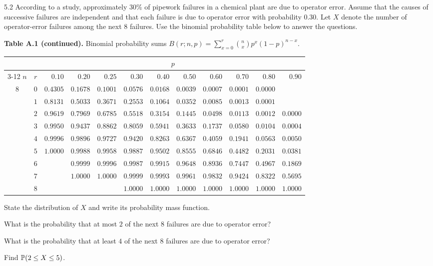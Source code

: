 \documentclass[11pt,oneside]{article}
\begin{document}
\begin{problem}{5.2}
According to a study, approximately $30\%$ of pipework failures in a chemical plant are due to operator error. Assume that the causes of successive failures are independent and that each failure is due to operator error with probability $0.30$. Let $X$ denote the number of operator-error failures among the next $8$ failures. Use the binomial probability table below to answer the questions.

\begin{center}
\begingroup
\scriptsize
\setlength{\tabcolsep}{3.2pt}
\renewcommand{\arraystretch}{1.18}
\noindent\textbf{Table A.1 (continued).} Binomial probability sums $B(r;n,p)=\displaystyle\sum_{x=0}^{r}\binom nx p^x(1-p)^{n-x}$.
\par\smallskip
\begin{tabular}{@{}cc*{10}{r}@{}}
\toprule
&&\multicolumn{10}{c}{$p$}\\
\cmidrule(l){3-12}
$n$ & $r$ & $0.10$ & $0.20$ & $0.25$ & $0.30$ & $0.40$ & $0.50$ & $0.60$ & $0.70$ & $0.80$ & $0.90$\\
\midrule
$8$ & $0$ & $0.4305$ & $0.1678$ & $0.1001$ & $0.0576$ & $0.0168$ & $0.0039$ & $0.0007$ & $0.0001$ & $0.0000$ & {}\\
& $1$ & $0.8131$ & $0.5033$ & $0.3671$ & $0.2553$ & $0.1064$ & $0.0352$ & $0.0085$ & $0.0013$ & $0.0001$ & {}\\
& $2$ & $0.9619$ & $0.7969$ & $0.6785$ & $0.5518$ & $0.3154$ & $0.1445$ & $0.0498$ & $0.0113$ & $0.0012$ & $0.0000$\\
& $3$ & $0.9950$ & $0.9437$ & $0.8862$ & $0.8059$ & $0.5941$ & $0.3633$ & $0.1737$ & $0.0580$ & $0.0104$ & $0.0004$\\
& $4$ & $0.9996$ & $0.9896$ & $0.9727$ & $0.9420$ & $0.8263$ & $0.6367$ & $0.4059$ & $0.1941$ & $0.0563$ & $0.0050$\\
& $5$ & $1.0000$ & $0.9988$ & $0.9958$ & $0.9887$ & $0.9502$ & $0.8555$ & $0.6846$ & $0.4482$ & $0.2031$ & $0.0381$\\
& $6$ & {} & $0.9999$ & $0.9996$ & $0.9987$ & $0.9915$ & $0.9648$ & $0.8936$ & $0.7447$ & $0.4967$ & $0.1869$\\
& $7$ & {} & $1.0000$ & $1.0000$ & $0.9999$ & $0.9993$ & $0.9961$ & $0.9832$ & $0.9424$ & $0.8322$ & $0.5695$\\
& $8$ & {} & {} & {} & $1.0000$ & $1.0000$ & $1.0000$ & $1.0000$ & $1.0000$ & $1.0000$ & $1.0000$\\
\bottomrule
\end{tabular}
\endgroup
\end{center}

\begin{problemsubparts}
\item State the distribution of $X$ and write its probability mass function.
\item What is the probability that at most $2$ of the next $8$ failures are due to operator error?
\item What is the probability that at least $4$ of the next $8$ failures are due to operator error?
\item Find $\mathbb{P}(2\le X\le5)$.
\end{problemsubparts}
\end{problem}
\end{document}
